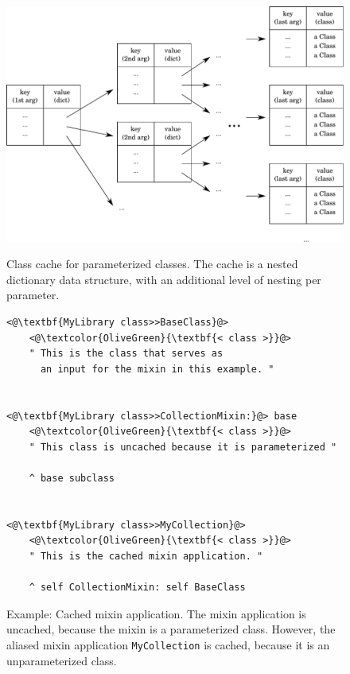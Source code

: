 \begin{figure}[!htp]
	\begin{minipage}{\textwidth}
	\includegraphics[width=\textwidth]{class_cache.pdf}
	\centering
	\caption[Class cache for parameterized classes]{Class cache for parameterized classes. The cache is a nested dictionary data structure, with an additional level of nesting per parameter.}
	\label{fig:impl_class_cache}
	\end{minipage}
	\begin{minipage}{\textwidth}
	\vspace{30pt}
	\begin{lstlisting}
<@\textbf{MyLibrary class>>BaseClass}@>
    <@\textcolor{OliveGreen}{\textbf{< class >}}@>
    " This is the class that serves as 
      an input for the mixin in this example. "
	

<@\textbf{MyLibrary class>>CollectionMixin:}@> base
    <@\textcolor{OliveGreen}{\textbf{< class >}}@>
    " This class is uncached because it is parameterized "

    ^ base subclass


<@\textbf{MyLibrary class>>MyCollection}@>
    <@\textcolor{OliveGreen}{\textbf{< class >}}@>
    " This is the cached mixin application. "

    ^ self CollectionMixin: self BaseClass
\end{lstlisting}
\caption[Cached mixin application]{Example: Cached mixin application. The mixin application is uncached, because the mixin is a parameterized class. However, the aliased mixin application \texttt{MyCollection} is cached, because it is an unparameterized class.}
\label{fig:impl_cached_mixin_application}
\end{minipage}
\end{figure}

